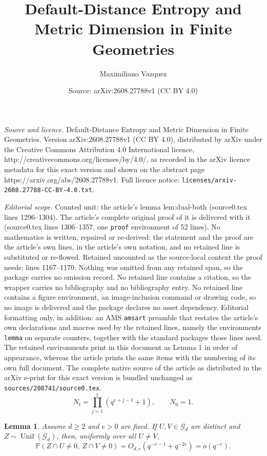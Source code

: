 \documentclass[10pt,a4paper]{amsart}
\title{Default-Distance Entropy and Metric Dimension in Finite Geometries}
\author{Maximiliano Vazquez}
\date{Source: arXiv:2608.27788v1 (CC BY 4.0)}
\newtheorem{lemma}{Lemma}
\newcommand{\Prob}{\mathbb P}
\newcommand{\Unif}{\operatorname{Unif}}
\begin{document}
\maketitle

\noindent\emph{Source and licence.} Default-Distance Entropy and Metric Dimension in Finite Geometries. Version arXiv:2608.27788v1 (CC BY 4.0), distributed by arXiv under the Creative Commons Attribution 4.0 International licence, http://creativecommons.org/licenses/by/4.0/, as recorded in the arXiv licence metadata for this exact version and shown on the abstract page https://arxiv.org/abs/2608.27788v1. Full licence notice: \texttt{licenses/arxiv-2608.27788-CC-BY-4.0.txt}.\par\smallskip

\noindent\textit{Editorial scope.} Counted unit: the article's lemma lem:dual-both (source0.tex lines 1296--1304). The article's complete original proof of it is delivered with it (source0.tex lines 1306--1357, one \texttt{proof} environment of 52 lines). No mathematics is written, repaired or re-derived: the statement and the proof are the article's own lines, in the article's own notation, and no retained line is substituted or re-flowed.  Retained uncounted as the source-local context the proof needs: lines 1167--1170.  Nothing was omitted from any retained span, so the package carries no omission record.  No retained line contains a citation, so the wrapper carries no bibliography and no bibliography entry.  No retained line contains a figure environment, an image-inclusion command or drawing code, so no image is delivered and the package declares no asset dependency.  Editorial formatting only, in addition: an AMS \texttt{amsart} preamble that restates the article's own declarations and macros used by the retained lines, namely the environments \texttt{lemma} on separate counters, together with the standard packages those lines need.  The retained environments print in this document as Lemma 1 in order of appearance, whereas the article prints the same items with the numbering of its own full document.  The complete native source of the article as distributed in the arXiv e-print for this exact version is bundled unchanged as \texttt{sources/208741/source0.tex}.
\begin{equation}\label{eq:dual-residue-count}
        N_t=\prod_{j=1}^t(q^{e+j-1}+1),
        \qquad N_0=1.
\end{equation}

\begin{lemma}\label{lem:dual-both}
Assume $d\geq2$ and $e>0$ are fixed.  If $U,V\in\mathcal G_d$ are distinct
and $Z\sim\Unif(\mathcal G_d)$, then, uniformly over all $U\neq V$,
\[
        \Prob(Z\cap U\neq0,\ Z\cap V\neq0)
        =O_{d,e}(q^{-e-1}+q^{-2e})
        =o(q^{-e}).
\]
\end{lemma}
\end{document}
